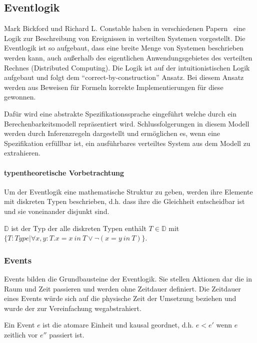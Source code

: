 \subsection{Eventlogik}

Mark Bickford und Richard L. Constable haben in verschiedenen
Papern~\cite{bickford2003logic, bickford2005causal, bickford2009component} eine Logik zur Beschreibung
von Ereignissen in verteilten Systemen vorgestellt. Die Eventlogik ist so
aufgebaut, dass eine breite Menge von Systemen beschrieben werden kann, auch
außerhalb des eigentlichen Anwendungsgebietes des verteilten Rechnes
(Distributed Computing).  Die Logik ist auf der
intuitionistischen Logik aufgebaut und folgt dem ``correct-by-construction''
Ansatz. Bei diesem Ansatz werden aus Beweisen für Formeln korrekte Implementierungen für
diese gewonnen.~\cite{bates1985proofs}

Dafür wird eine abstrakte Spezifikationssprache eingeführt welche durch
ein Berechenbarkeitsmodell repräsentiert wird.
Schlussfolgerungen in diesem Modell werden durch Inferenzregeln dargestellt und
ermöglichen es, wenn eine Spezifikation erfüllbar ist, ein ausführbares
verteiltes System aus dem Modell zu extrahieren.~\cite{bickford2005causal}


\paragraph{typentheoretische Vorbetrachtung}
Um der Eventlogik eine mathematische Struktur zu geben, werden ihre
Elemente mit diskreten Typen beschrieben, d.h. dass ihre die Gleichheit
entscheidbar ist und sie voneinander disjunkt sind.

\begin{defi}
  $\mathbb{D}$ ist der Typ der alle diskreten Typen enthält $T\in\mathbb{D}$ mit $\{T:Type|\forall x,y : T.x = x\ in\ T \vee\neg (x = y\ in\
  T)\}$.
\end{defi}

\subsubsection{Events}
Events bilden die Grundbausteine der Eventlogik.
Sie stellen Aktionen dar die in Raum und Zeit passieren und
werden ohne Zeitdauer definiert.
Die Zeitdauer eines Events würde sich auf die physische Zeit der
Umsetzung beziehen und wurde der zur Vereinfachung
wegabstrahiert.~\cite{bickford2005causal}

\begin{defi}
  Ein Event $e$ ist die atomare Einheit und kausal geordnet, d.h.
  $e< e'$ wenn $e$ zeitlich vor $e''$ passiert ist.
\end{defi}

